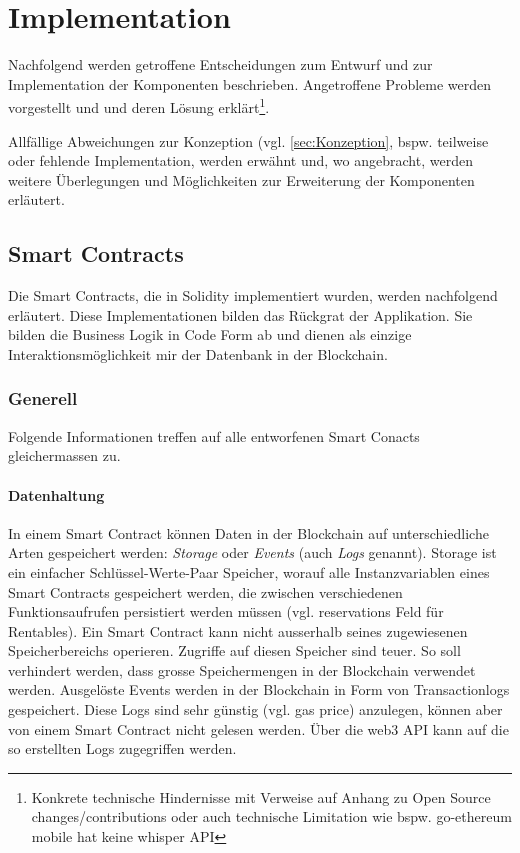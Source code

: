 \section{Implementation}
\label{sec:Implementation}
Nachfolgend werden getroffene Entscheidungen zum Entwurf und zur Implementation der Komponenten beschrieben. Angetroffene Probleme werden vorgestellt und und deren Lösung erklärt\footnote{Konkrete technische Hindernisse mit Verweise auf Anhang zu Open Source changes/contributions oder auch technische Limitation wie bspw. go-ethereum mobile hat keine whisper API}.

Allfällige Abweichungen zur Konzeption (vgl. \ref{sec:Konzeption}, bspw. teilweise oder fehlende Implementation, werden erwähnt und, wo angebracht, werden weitere Überlegungen und Möglichkeiten zur Erweiterung der Komponenten erläutert.

\subsection{Smart Contracts}
\label{subsec:Smart_Contracts}
Die Smart Contracts, die in Solidity implementiert wurden, werden nachfolgend erläutert. Diese Implementationen bilden das Rückgrat der Applikation. Sie bilden die Business Logik in Code Form ab und dienen als einzige Interaktionsmöglichkeit mir der Datenbank in der Blockchain.\cite[Introduction to Smart Contracts]{solidity.readthedocs.io}

\subsubsection{Generell}
Folgende Informationen treffen auf alle entworfenen Smart Conacts gleichermassen zu.
\paragraph{Datenhaltung}
In einem Smart Contract können Daten in der Blockchain auf unterschiedliche Arten gespeichert werden: \emph{Storage} oder \emph{Events} (auch \emph{Logs} genannt). Storage ist ein einfacher Schlüssel-Werte-Paar Speicher, worauf alle Instanzvariablen eines Smart Contracts gespeichert werden, die zwischen verschiedenen Funktionsaufrufen persistiert werden müssen (vgl. reservations Feld für Rentables). Ein Smart Contract kann nicht ausserhalb seines zugewiesenen Speicherbereichs operieren. Zugriffe auf diesen Speicher sind teuer. So soll verhindert werden, dass grosse Speichermengen in der Blockchain verwendet werden. Ausgelöste Events werden in der Blockchain in Form von Transactionlogs gespeichert. Diese Logs sind sehr günstig (vgl. gas price) anzulegen, können aber von einem Smart Contract nicht gelesen werden. Über die web3 API kann auf die so erstellten Logs zugegriffen werden.\cite[Miscellaneous/Introduction to Smart Contracts]{solidity.readthedocs.io}\cite{jonathanpatrick.me/ethereum}

